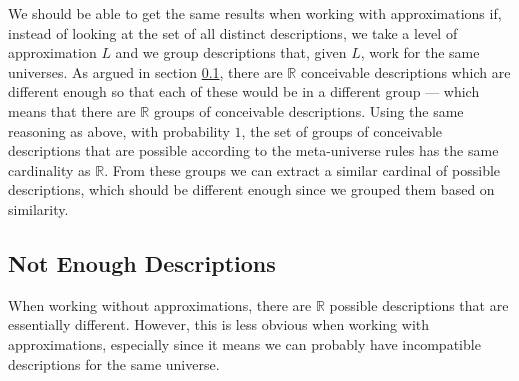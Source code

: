 \documentclass[a4paper
,draft
]{article}
\def\reale{\mathbb{R}}
\newcommand{\paper}[1]{paper}
\begin{document}



We should be able to get the same results when working with approximations
if, instead of looking at the set
of all distinct descriptions, we take a level of approximation $L$
and we group descriptions that, given $L$, work for the same universes.
As argued in section \ref{sec:not-enough-descriptions},
there are $\reale$ conceivable descriptions which are different
enough so that each of these would be in a different group --- which means that
there are $\reale$ groups of conceivable descriptions.
Using the same reasoning as above, with probability $1$, the set of groups of
conceivable descriptions that are possible according to the meta-universe
rules has the same cardinality as $\reale$.
From these groups we can extract a similar cardinal of
possible descriptions, which should be different enough since we grouped them
based on similarity.

\subsection{Not Enough Descriptions}
\label{sec:not-enough-descriptions}

When working without approximations, there are $\reale$ possible descriptions
that are essentially different. However, this is less obvious when working with
approximations, especially since it means we can probably have incompatible
descriptions for the same universe.
\end{document}
